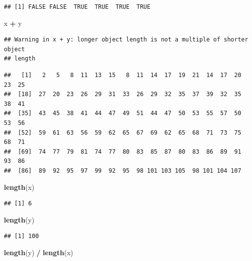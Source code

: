 \documentclass[]{book}
\newenvironment{Shaded}{\begin{snugshade}}{\end{snugshade}}
\newcommand{\KeywordTok}[1]{\textcolor[rgb]{0.13,0.29,0.53}{\textbf{#1}}}
\newcommand{\StringTok}[1]{\textcolor[rgb]{0.31,0.60,0.02}{#1}}
\newcommand{\OperatorTok}[1]{\textcolor[rgb]{0.81,0.36,0.00}{\textbf{#1}}}
\newcommand{\NormalTok}[1]{#1}
\theoremstyle{definition}
\theoremstyle{definition}
\theoremstyle{definition}
\theoremstyle{remark}
\begin{document}
\begin{verbatim}
## [1] FALSE FALSE  TRUE  TRUE  TRUE  TRUE
\end{verbatim}

\begin{Shaded}
\begin{Highlighting}[]
\NormalTok{x }\OperatorTok{+}\StringTok{ }\NormalTok{y}
\end{Highlighting}
\end{Shaded}

\begin{verbatim}
## Warning in x + y: longer object length is not a multiple of shorter object
## length
\end{verbatim}

\begin{verbatim}
##   [1]   2   5   8  11  13  15   8  11  14  17  19  21  14  17  20  23  25
##  [18]  27  20  23  26  29  31  33  26  29  32  35  37  39  32  35  38  41
##  [35]  43  45  38  41  44  47  49  51  44  47  50  53  55  57  50  53  56
##  [52]  59  61  63  56  59  62  65  67  69  62  65  68  71  73  75  68  71
##  [69]  74  77  79  81  74  77  80  83  85  87  80  83  86  89  91  93  86
##  [86]  89  92  95  97  99  92  95  98 101 103 105  98 101 104 107
\end{verbatim}

\begin{Shaded}
\begin{Highlighting}[]
\KeywordTok{length}\NormalTok{(x)}
\end{Highlighting}
\end{Shaded}

\begin{verbatim}
## [1] 6
\end{verbatim}

\begin{Shaded}
\begin{Highlighting}[]
\KeywordTok{length}\NormalTok{(y)}
\end{Highlighting}
\end{Shaded}

\begin{verbatim}
## [1] 100
\end{verbatim}

\begin{Shaded}
\begin{Highlighting}[]
\KeywordTok{length}\NormalTok{(y) }\OperatorTok{/}\StringTok{ }\KeywordTok{length}\NormalTok{(x)}
\end{Highlighting}
\end{Shaded}
\end{document}
